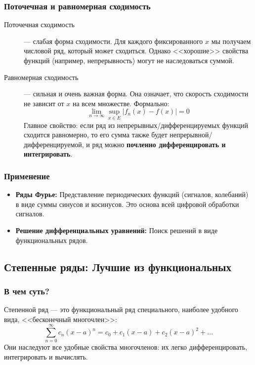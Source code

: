 \documentclass[a4paper, 12pt]{report}
\numberwithin{equation}{section}
\begin{document}
\subsubsection{Поточечная и равномерная сходимость}
\begin{description}
	\item[Поточечная сходимость] — слабая форма сходимости. Для каждого фиксированного $x$ мы получаем числовой ряд, который может сходиться. Однако <<хорошие>> свойства функций (например, непрерывность) могут не наследоваться суммой.
	\item[Равномерная сходимость] — сильная и очень важная форма. Она означает, что скорость сходимости не зависит от $x$ на всем множестве. Формально:
	$$ \lim_{n \to \infty} \sup_{x \in E} |f_n(x) - f(x)| = 0 $$
	Главное свойство: если ряд из непрерывных/дифференцируемых функций сходится равномерно, то его сумма также будет непрерывной/дифференцируемой, и ряд можно \textbf{почленно дифференцировать и интегрировать}.
\end{description}

\subsubsection{Применение}
\begin{itemize}
	\item \textbf{Ряды Фурье:} Представление периодических функций (сигналов, колебаний) в виде суммы синусов и косинусов. Это основа всей цифровой обработки сигналов.
	\item \textbf{Решение дифференциальных уравнений:} Поиск решений в виде функциональных рядов.
\end{itemize}

\subsection{Степенные ряды: Лучшие из функциональных}

\subsubsection{В чем суть?}
Степенной ряд — это функциональный ряд специального, наиболее удобного вида, <<бесконечный многочлен>>:
$$ \sum_{n=0}^{\infty} c_n (x-a)^n = c_0 + c_1(x-a) + c_2(x-a)^2 + \dots $$
Они наследуют все удобные свойства многочленов: их легко дифференцировать, интегрировать и вычислять.
\end{document}
